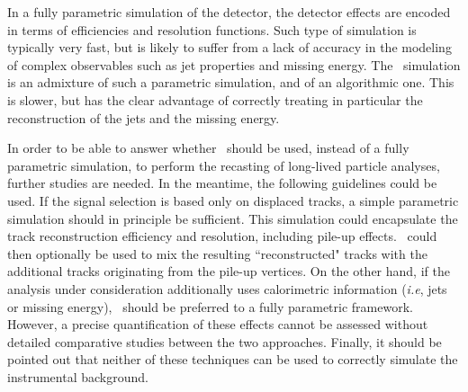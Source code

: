 In a fully parametric simulation of the detector, the detector effects are encoded in
terms of efficiencies and resolution functions. Such type of simulation is
typically very fast, but is likely to suffer from a lack of accuracy in the
modeling of complex observables such as jet properties and missing energy. The
\DEL\ simulation is an admixture of such a parametric simulation, and of an
algorithmic one. This is slower, but has the clear advantage of correctly
treating in particular the reconstruction of the jets and the missing energy.

In order to be able to answer whether \DEL\ should be used, instead of a fully
parametric simulation, to perform the recasting of long-lived particle analyses,
further studies are needed. In the meantime, the following guidelines could be
used. If the signal selection is based only on displaced tracks, a simple
parametric simulation should in principle be sufficient. This simulation could encapsulate the
track reconstruction efficiency and resolution, including pile-up effects. \DEL\
could then optionally be used to mix the resulting ``reconstructed" tracks with the additional tracks originating from the pile-up vertices.
On the other hand, if the analysis under consideration additionally uses
calorimetric information ({\it i.e}, jets or missing energy), \DEL\ should be
preferred to a fully parametric framework. However, a precise
quantification of these effects cannot be assessed without detailed comparative
studies between the two approaches. Finally, it should be pointed out that
neither of these techniques can be used to correctly simulate the instrumental background.


